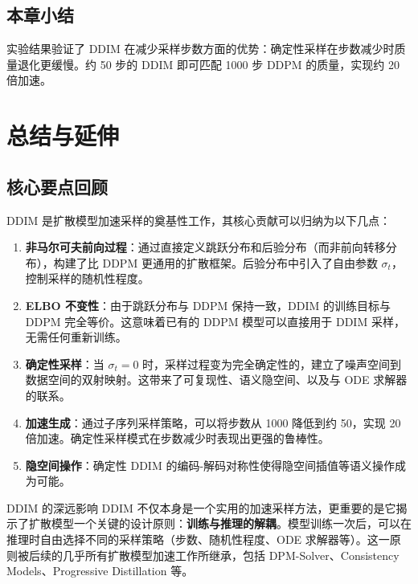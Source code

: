 \documentclass[a4paper]{article}
\begin{document}
\subsection{本章小结}

实验结果验证了 DDIM 在减少采样步数方面的优势：确定性采样在步数减少时质量退化更缓慢。约 50 步的 DDIM 即可匹配 1000 步 DDPM 的质量，实现约 20 倍加速。


\section{总结与延伸}

\subsection{核心要点回顾}

DDIM 是扩散模型加速采样的奠基性工作，其核心贡献可以归纳为以下几点：

\begin{enumerate}
    \item \textbf{非马尔可夫前向过程}：通过直接定义跳跃分布和后验分布（而非前向转移分布），构建了比 DDPM 更通用的扩散框架。后验分布中引入了自由参数 $\sigma_t$，控制采样的随机性程度。

    \item \textbf{ELBO 不变性}：由于跳跃分布与 DDPM 保持一致，DDIM 的训练目标与 DDPM 完全等价。这意味着已有的 DDPM 模型可以直接用于 DDIM 采样，无需任何重新训练。

    \item \textbf{确定性采样}：当 $\sigma_t = 0$ 时，采样过程变为完全确定性的，建立了噪声空间到数据空间的双射映射。这带来了可复现性、语义隐空间、以及与 ODE 求解器的联系。

    \item \textbf{加速生成}：通过子序列采样策略，可以将步数从 1000 降低到约 50，实现 20 倍加速。确定性采样模式在步数减少时表现出更强的鲁棒性。

    \item \textbf{隐空间操作}：确定性 DDIM 的编码-解码对称性使得隐空间插值等语义操作成为可能。
\end{enumerate}

\begin{importantbox}{DDIM 的深远影响}
DDIM 不仅本身是一个实用的加速采样方法，更重要的是它揭示了扩散模型一个关键的设计原则：\textbf{训练与推理的解耦}。模型训练一次后，可以在推理时自由选择不同的采样策略（步数、随机性程度、ODE 求解器等）。这一原则被后续的几乎所有扩散模型加速工作所继承，包括 DPM-Solver、Consistency Models、Progressive Distillation 等。
\end{importantbox}
\end{document}
